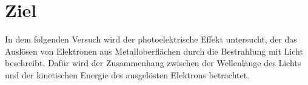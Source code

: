 \section{Ziel}
\label{sec:Ziel}

In dem folgenden Versuch wird der photoelektrische Effekt untersucht,
der das Auslösen von Elektronen aus Metalloberflächen durch die Bestrahlung mit Licht beschreibt. 
Dafür wird der Zusammenhang zwischen der Wellenlänge des Lichts und der kinetischen Energie des
ausgelösten Elektrons betrachtet.